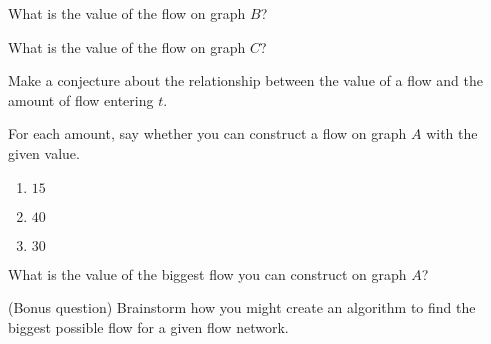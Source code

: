 \documentclass{tufte-handout}
\begin{document}
\begin{questions}
  \item What is the value of the flow on graph $B$?
  \item What is the value of the flow on graph $C$?
  \item Make a conjecture about the relationship between the value of
    a flow and the amount of flow entering $t$.
  \item For each amount, say whether you can construct a flow on graph
    $A$ with the given value.
    \begin{enumerate}[label=(\alph*)]
    \item $15$ \vspace{1in}
    \item $40$ \vspace{1in}
    \item $30$ \vspace{1in}
    \end{enumerate}
  \item What is the value of the biggest flow you can construct on
    graph $A$?
  \item (Bonus question) Brainstorm how you might create an algorithm
    to find the biggest possible flow for a given flow network.
\end{questions}
\end{document}
